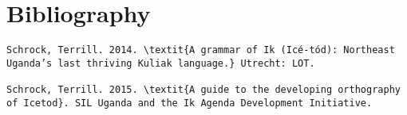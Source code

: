 \section{Bibliography}

\begin{verbatim} 
Schrock, Terrill. 2014. \textit{A grammar of Ik (Icé-tód): Northeast Uganda’s last thriving Kuliak language.} Utrecht: LOT.

Schrock, Terrill. 2015. \textit{A guide to the developing orthography of Icetod}. SIL Uganda and the Ik Agenda Development Initiative. 


\end{verbatim}
